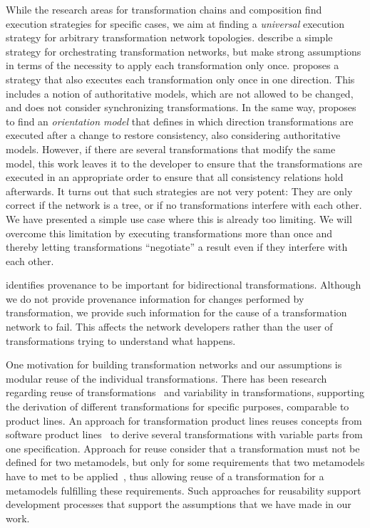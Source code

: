 While the research areas for transformation chains and composition find execution strategies for specific cases, we aim at finding a \emph{universal} execution strategy for arbitrary transformation network topologies.
\textcite{dirocco2017ConsistencyRecoveryInteractive-MODELS} describe a simple strategy for orchestrating transformation networks, but make strong assumptions in terms of the necessity to apply each transformation only once.
\textcite{stevens2020BidirectionalTransformationLarge-SoSym} proposes a strategy that also executes each transformation only once in one direction. This includes a notion of authoritative models, which are not allowed to be changed, and does not consider synchronizing transformations.
In the same way, \cite{stevens2020BuildingFromMegamodels-SoSym} proposes to find an \emph{orientation model} that defines in which direction transformations are executed after a change to restore consistency, also considering authoritative models.
However, if there are several transformations that modify the same model, this work leaves it to the developer to ensure that the transformations are executed in an appropriate order to ensure that all consistency relations hold afterwards.
It turns out that such strategies are not very potent:
They are only correct if the network is a tree, or if no transformations interfere with each other.
We have presented a simple use case where this is already too limiting.
We will overcome this limitation by executing transformations more than once and thereby letting transformations \enquote{negotiate} a result even if they interfere with each other.

\textcite{anjorin2019provenance-tapp} identifies provenance to be important for bidirectional transformations.
Although we do not provide provenance information for changes performed by transformation, we provide such information for the cause of a transformation network to fail.
This affects the network developers rather than the user of transformations trying to understand what happens.

One motivation for building transformation networks and our assumptions is modular reuse of the individual transformations.
There has been research regarding reuse of transformations~\cite{bruel2020transformationReuse-SoSym} and variability in transformations, supporting the derivation of different transformations for specific purposes, comparable to product lines.
An approach for transformation product lines reuses concepts from software product lines~\cite{delara2018transformationProductLines-Models} to derive several transformations with variable parts from one specification.
Approach for reuse consider that a transformation must not be defined for two metamodels, but only for some requirements that two metamodels have to met to be applied~\cite{delara2019transformationResue-TOSEM}, thus allowing reuse of a transformation for a metamodels fulfilling these requirements.
Such approaches for reusability support development processes that support the assumptions that we have made in our work.


